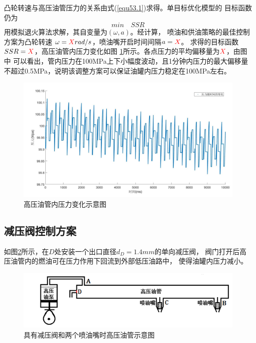 \documentclass[withoutpreface,bwprint]{cumcmthesis} %
\begin{document}
    凸轮转速与高压油管压力的关系由式(\ref{equ53.1})求得。单目标优化模型的
    目标函数仍为
    \begin{equation*}
        min \quad SSR
    \end{equation*}
    用模拟退火算法求解，其自变量为$(\omega,a)$。经计算，
    喷油和供油策略的最佳控制方案为凸轮转速
    $\omega={\color{red}X}rad/s$，喷油嘴开启时间间隔$a={\color{red}X}$。
    求得的目标函数$SSR={\color{red}X}$，高压油管内压力变化如图
    {\ref{figure17}}所示。各点压力的平均偏移量为${\color{red}X}$，由图中
    可以看出，管内压力在100MPa上下小幅度波动，且1分钟内压力的最大偏移量
    不超过0.5MPa，说明该调整方案可以保证油罐内压力稳定在100MPa左右。
    \begin{figure}[!h]
        \centering
        \includegraphics[width=.95\textwidth]{q210s.jpg}
        \caption{高压油管内压力变化示意图}
        \label{figure17}
    \end{figure}

\subsection{减压阀控制方案}
    如图\ref{figure18}所示，在$D$处安装一个出口直径$d_D=1.4mm$的单向减压阀，
    阀门打开后高压油管内的燃油可在压力作用下回流到外部低压油路中，
    使得油罐内压力减小。
    \begin{figure}[h]
        \centering
        \includegraphics[width=.8\textwidth]{sample.png}
        \caption{具有减压阀和两个喷油嘴时高压油管示意图}
        \label{figure18}
    \end{figure}
\end{document}
